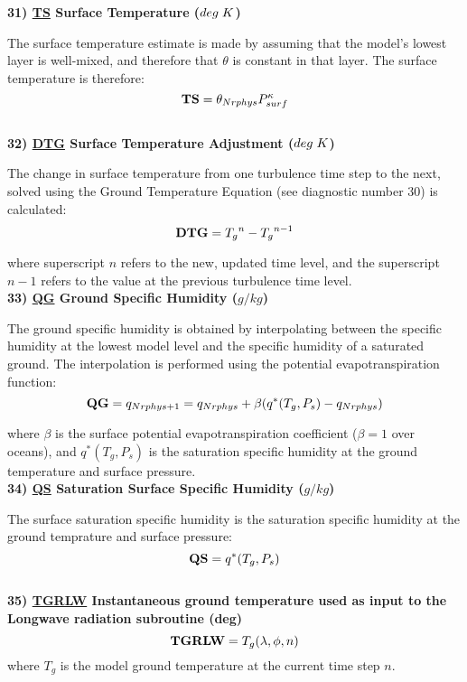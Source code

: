\noindent
{\bf 31)  \underline {TS}  Surface Temperature ($deg \hspace{.1cm} K$) }

\noindent
The surface temperature estimate is made by assuming that the model's lowest
layer is well-mixed, and therefore that $\theta$ is constant in that layer.
The surface temperature is therefore:
\[
{\bf TS} = \theta_{Nrphys} P^{\kappa}_{surf}
\]
\\
 
\noindent
{\bf 32)  \underline {DTG}  Surface Temperature Adjustment ($deg \hspace{.1cm} K$) }

\noindent
The change in surface temperature from one turbulence time step to the next, solved
using the Ground Temperature Equation (see diagnostic number 30) is calculated:
\[
{\bf DTG} = {T_g}^{n} - {T_g}^{n-1}
\]

\noindent
where superscript $n$ refers to the new, updated time level, and the superscript $n-1$
refers to the value at the previous turbulence time level.
\\
 
\noindent
{\bf 33)  \underline {QG}  Ground Specific Humidity ($g/kg$) }

\noindent
The ground specific humidity is obtained by interpolating between the specific
humidity at the lowest model level and the specific humidity of a saturated ground.
The interpolation is performed using the potential evapotranspiration function:
\[
{\bf QG} = q_{Nrphys+1} = q_{Nrphys} + \beta(q^*(T_g,P_s) - q_{Nrphys})
\]

\noindent
where $\beta$ is the surface potential evapotranspiration coefficient ($\beta=1$ over oceans), 
and $q^*(T_g,P_s)$ is the saturation specific humidity at the ground temperature and surface
pressure.
\\
 
\noindent
{\bf 34)  \underline {QS}  Saturation Surface Specific Humidity ($g/kg$) }

\noindent
The surface saturation specific humidity is the saturation specific humidity at
the ground temprature and surface pressure:
\[
{\bf QS} = q^*(T_g,P_s)
\]
\\
 
\noindent
{\bf 35)  \underline {TGRLW} Instantaneous ground temperature used as input to the Longwave
 radiation subroutine (deg)}
\[
{\bf TGRLW}  = T_g(\lambda , \phi ,n)
\]
\noindent
where $T_g$ is the model ground temperature at the current time step $n$.
\\
 
